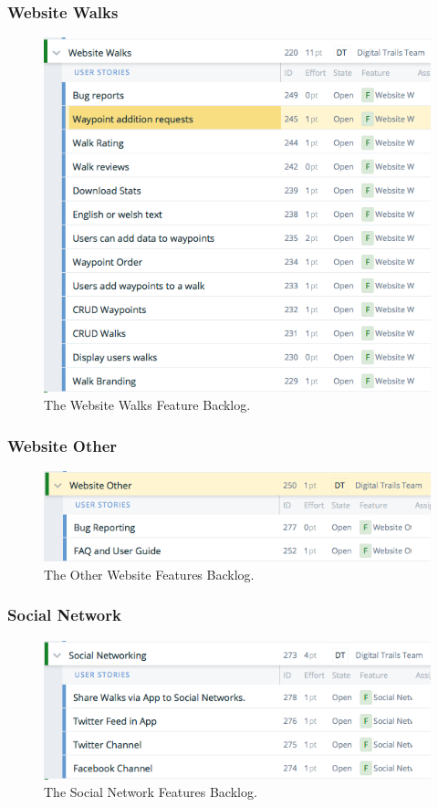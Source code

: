 \documentclass[11pt,a4paper]{article}
\begin{document}
\subsubsection{Website Walks}
\begin{figure}[H]
\centering
\includegraphics[width = 140mm]{backlog/WebWalks.png}
\caption{The Website Walks Feature Backlog.}
\label{fig:backlogwebwalk}
\end{figure}

\subsubsection{Website Other}
\begin{figure}[H]
\centering
\includegraphics[width = 140mm]{backlog/WebOther.png}
\caption{The Other Website Features Backlog.}
\label{fig:backlogwebother}
\end{figure}

\subsubsection{Social Network}
\begin{figure}[H]
\centering
\includegraphics[width = 140mm]{backlog/Social.png}
\caption{The Social Network Features Backlog.}
\label{fig:backlogSoci}
\end{figure}
\end{document}
